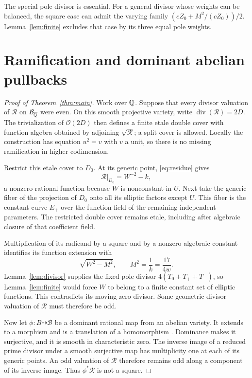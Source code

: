 \documentclass[11pt,a4paper]{article}
\theoremstyle{remark}\newtheorem{remark}[theorem]{Remark}
\DeclareMathOperator{\divisor}{div}\DeclareMathOperator{\Pic}{Pic}
\begin{document}
The special pole divisor is essential. For a general divisor whose
weights can be balanced, the square case can admit the varying family
$(cZ_0+M^2/(cZ_0))/2$. Lemma~\ref{lem:finite} excludes that case
by its three equal pole weights.

\section{Ramification and dominant abelian pullbacks}

\begin{proof}[Proof of Theorem~\ref{thm:main}]
Work over $\overline{\mathbb Q}$. Suppose that every divisor valuation of
$\mathcal R$ on $\mathcal B_{\overline{\mathbb Q}}$ were even. On this smooth
projective variety, write $\divisor(\mathcal R)=2D$. The
trivialization of $\mathcal O(2D)$ then defines a finite etale
double cover with function algebra obtained by adjoining
$\sqrt{\mathcal R}$; a split cover is allowed. Locally the
construction has equation $u^2=v$ with $v$ a unit, so there
is no missing ramification in higher codimension.

Restrict this etale cover to $D_0$. At its generic point,
\eqref{eq:residue} gives
\[
                    \mathcal R|_{D_0}=W^{-2}-k,
\]
a nonzero rational function because $W$ is nonconstant in $U$.
Next take the generic fiber of the projection of $D_0$ onto all
its elliptic factors except $U$. This fiber is the constant curve
$E_+$ over the function field of the remaining independent
parameters. The restricted double cover remains etale, including
after algebraic closure of that coefficient field.

Multiplication of its radicand by a square and by a nonzero
algebraic constant identifies its function extension with
\[
                         \sqrt{W^2-M^2},\qquad
                         M^2=\frac1k=\frac{17}{4w}.
\]
Lemma~\ref{lem:divisor} supplies the fixed pole divisor
$4(T_0+T_++T_-)$, so Lemma~\ref{lem:finite} would force $W$
to belong to a finite constant set of elliptic functions.
This contradicts its moving zero divisor. Some geometric divisor
valuation of $\mathcal R$ must therefore be odd.

Now let $\phi:B\dashrightarrow\mathcal B$ be a dominant
rational map from an abelian variety. It extends to a morphism
and is a translation of a homomorphism
\cite[Theorem~3.1 and Corollary~2.2]{Milne}. Dominance makes it
surjective, and it is smooth in characteristic zero. The inverse
image of a reduced prime divisor under a smooth surjective map
has multiplicity one at each of its generic points. An odd
valuation of $\mathcal R$ therefore remains odd along a component
of its inverse image. Thus $\phi^*\mathcal R$ is not a square.
\end{proof}
\end{document}
